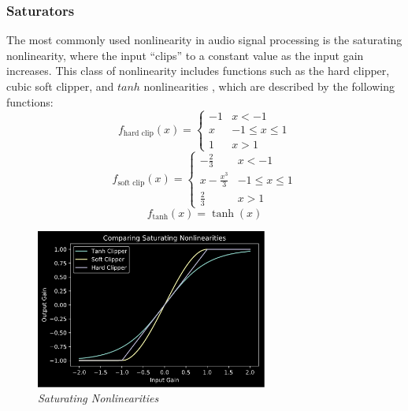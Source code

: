 \documentclass[twoside,a4paper]{article}
\begin{document}
\subsubsection{Saturators} \label{sec:sat}
%
The most commonly used nonlinearity in audio signal processing is
the saturating nonlinearity, where the input ``clips'' to a constant
value as the input gain increases. This class of nonlinearity includes
functions such as the hard clipper, cubic soft clipper, and $tanh$
nonlinearities \cite{Yeh}, which are described by the following functions:
%
\begin{equation}
    f_{\text{hard clip}}(x) = \begin{cases}
        -1& x < -1 \\
        x& -1 \leq x \leq 1 \\
        1& x > 1
    \end{cases}
    \label{eq:hard-clip}
\end{equation}
\newline
%
\begin{equation}
    f_{\text{soft clip}}(x) = \begin{cases}
        -\frac{2}{3}& x < -1 \\
        x - \frac{x^3}{3}& -1 \leq x \leq 1 \\
        \frac{2}{3}& x > 1
    \end{cases}
    \label{eq:soft-clip}
\end{equation}
\newline
%
\begin{equation}
    f_{\text{tanh}}(x) = \tanh(x)
    \label{eq:tanh-clip}
\end{equation}
%
\begin{figure}[h]
    \center
    \includegraphics[width=3in]{../NonlinearBiquad/Pics/Sat-NLs.png}
    \caption{\label{Sats}{\it Saturating Nonlinearities}}
\end{figure}
%
\end{document}
